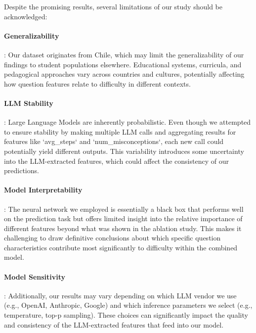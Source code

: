 \documentclass[
    a4paper, %
    10pt, %
    twoside, %
]{LTJournalArticle}
\begin{document}
Despite the promising results, several limitations of our study should be acknowledged:

\paragraph{Generalizability}: Our dataset originates from Chile, which may limit the generalizability of our findings to student populations elsewhere. Educational systems, curricula, and pedagogical approaches vary across countries and cultures, potentially affecting how question features relate to difficulty in different contexts.
    
\paragraph{LLM Stability}: Large Language Models are inherently probabilistic. Even though we attempted to ensure stability by making multiple LLM calls and aggregating results for features like `avg\_steps` and `num\_misconceptions`, each new call could potentially yield different outputs. This variability introduces some uncertainty into the LLM-extracted features, which could affect the consistency of our predictions.
    
\paragraph{Model Interpretability}: The neural network we employed is essentially a black box that performs well on the prediction task but offers limited insight into the relative importance of different features beyond what was shown in the ablation study. This makes it challenging to draw definitive conclusions about which specific question characteristics contribute most significantly to difficulty within the combined model.
    
\paragraph{Model Sensitivity}: Additionally, our results may vary depending on which LLM vendor we use (e.g., OpenAI, Anthropic, Google) and which inference parameters we select (e.g., temperature, top-p sampling). These choices can significantly impact the quality and consistency of the LLM-extracted features that feed into our model.

\end{document}
